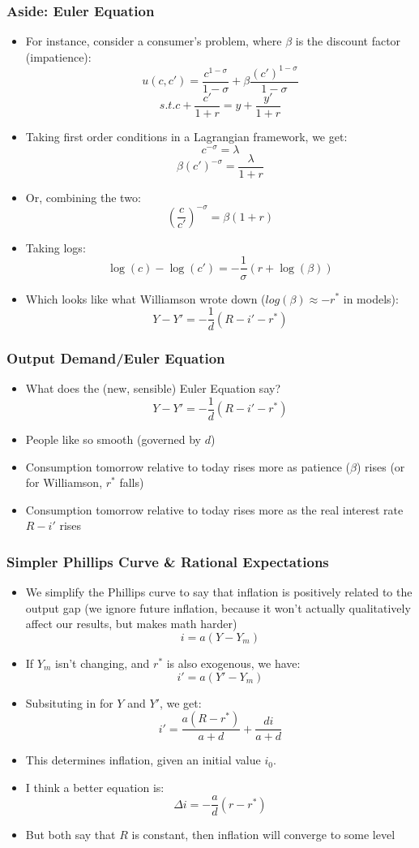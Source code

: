 \documentclass{beamer}
\begin{document}
\begin{frame}
\frametitle[alignment=center]{Aside: Euler Equation}
\footnotesize
\begin{itemize}
\item For instance, consider a consumer's problem, where $\beta$ is the discount factor (impatience):
$$u(c,c')=\frac{c^{1-\sigma}}{1-\sigma}+\beta\frac{(c')^{1-\sigma}}{1-\sigma}$$
$$s.t. c+\frac{c'}{1+r}=y+\frac{y'}{1+r}$$
\item Taking first order conditions in a Lagrangian framework, we get:
$$c^{-\sigma}=\lambda$$
$$\beta(c')^{-\sigma}=\frac{\lambda}{1+r}$$
\item Or, combining the two:
$$\left(\frac{c}{c'}\right)^{-\sigma}=\beta(1+r)$$
\item Taking logs:
$$\log(c)-\log(c')=-\frac{1}{\sigma}\left(r+\log(\beta)\right)$$
\item Which looks like what Williamson wrote down ($log(\beta)\approx -r^*$ in models):
$$Y-Y'=-\frac{1}{d}(R-i'-r^*)$$
\end{itemize}
\end{frame}

\begin{frame}
\frametitle[alignment=center]{Output Demand/Euler Equation}
\footnotesize
\begin{itemize}
\item What does the (new, sensible) Euler Equation say?
$$Y-Y'=-\frac{1}{d}(R-i'-r^*)$$
\item People like so smooth (governed by $d$)
\bigskip
\item Consumption tomorrow relative to today rises more as patience ($\beta$) rises (or for Williamson, $r^*$ falls)
\bigskip
\item Consumption tomorrow relative to today rises more as the real interest rate $R-i'$ rises
\end{itemize}
\end{frame}


\begin{frame}
\frametitle[alignment=center]{Simpler Phillips Curve \& Rational Expectations}
\footnotesize
\begin{itemize}
\item We simplify the Phillips curve to say that inflation is positively related to the output gap (we ignore future inflation, because it won't actually qualitatively affect our results, but makes math harder)
$$i=a(Y-Y_m)$$
\item If $Y_m$ isn't changing, and $r^*$ is also exogenous, we have:
$$i'=a(Y'-Y_m)$$
\item Subsituting in for $Y$ and $Y'$, we get:
$$i'=\frac{a(R-r^*)}{a+d}+\frac{di}{a+d}$$
\item This determines inflation, given an initial value $i_0$.
\bigskip
\item I think a better equation is:
$$\Delta i =-\frac{a}{d}\left(r-r^*\right)$$
\item But both say that $R$ is constant, then inflation will converge to some level
\end{itemize}
\end{frame}
\end{document}
